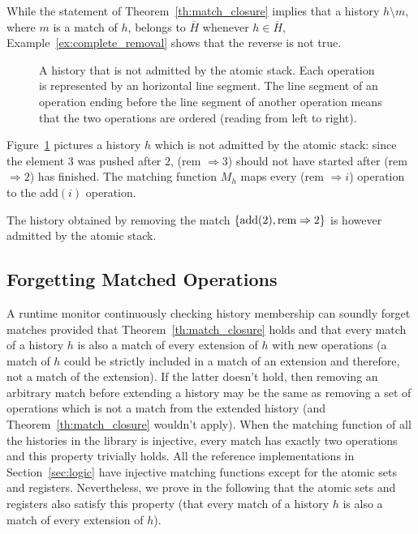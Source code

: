 While the statement of Theorem~\ref{th:match_closure} implies that a history
$h\setminus m$, where $m$ is a match of $h$, belongs to $\overline{H}$ whenever
$h\in \overline{H}$, Example~\ref{ex:complete_removal} shows that the reverse
is not true.

\begin{figure}

  

  \caption{A history that is not admitted by the atomic stack. Each operation
  is represented by an horizontal line segment. The line segment of an
  operation ending before the line segment of another operation means that the
  two operations are ordered (reading from left to right).}
  \label{fig:complete_removal}

\end{figure}

\begin{example}
  \label{ex:complete_removal}

  Figure~\ref{fig:complete_removal} pictures a history $h$ which is not admitted by
  the atomic stack: since the element $3$ was pushed after $2$, (\textnormal{rem} $\Rightarrow
  3$) should not have started after (\textnormal{rem} $\Rightarrow 2$) has finished. The
  matching function $M_h$ maps every (\textnormal{rem} $\Rightarrow i$) operation to the
  \textnormal{add}$(i)$ operation.

  The history obtained by removing the match ${\{  \textnormal{add}(2),
  \textnormal{rem}\Rightarrow 2  \}}$ is however admitted by the atomic stack.

\end{example}

\subsection{Forgetting Matched Operations}

A runtime monitor continuously checking history membership can soundly forget
matches provided that Theorem~\ref{th:match_closure} holds and that every match of a history $h$ is also a match of 
every extension of $h$ with new operations (a match of $h$
could be strictly included in a match of an extension and therefore, not a
match of the extension). If the latter doesn't hold, then removing an arbitrary match before
extending a history may be the same as removing a set of operations which is
not a match from the extended history (and
Theorem~\ref{th:match_closure} wouldn't apply). When the
matching function of all the histories in the library is injective, every
match has exactly two operations and this property trivially holds. All the 
reference implementations in
Section~\ref{sec:logic} have injective matching functions except for the atomic sets and
registers. Nevertheless, we prove in the following that the atomic sets and registers also 
satisfy this property (that every match of a history $h$ is also a match of 
every extension of $h$).

